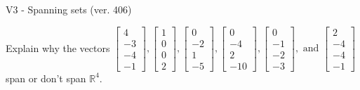 \begin{exercise}
  \begin{exerciseTitle}V3 - Spanning sets (ver. 406)\end{exerciseTitle}
  \begin{exerciseStatement}
    Explain why the vectors \(\left[\begin{array}{r}
4 \\
-3 \\
-4 \\
-1
\end{array}\right] , \left[\begin{array}{r}
1 \\
0 \\
0 \\
2
\end{array}\right] , \left[\begin{array}{r}
0 \\
-2 \\
1 \\
-5
\end{array}\right] , \left[\begin{array}{r}
0 \\
-4 \\
2 \\
-10
\end{array}\right] , \left[\begin{array}{r}
0 \\
-1 \\
-2 \\
-3
\end{array}\right] , \text{ and } \left[\begin{array}{r}
2 \\
-4 \\
-4 \\
-1
\end{array}\right]\) span or don't span \(\mathbb{R}^4\). 
	



\end{exerciseStatement}
\end{exercise}
